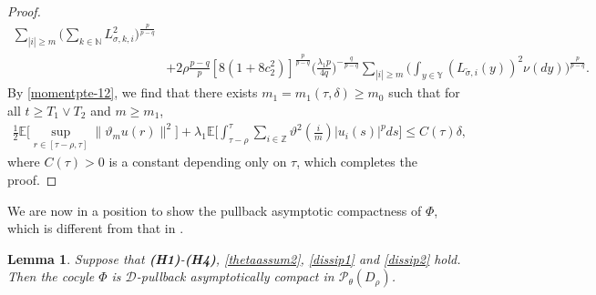 \documentclass[11pt]{article}
\numberwithin{equation}{section}
\theoremstyle{plain}
\newtheorem{lemma}{Lemma}[section]
\begin{document}
\begin{proof}
\begin{align}
                           \sum_{|i| \ge m} 
                                 \Big( \sum_{k \in \mathbb{N} } L^2_{\sigma,k,i} 
                                 \Big)^{ \frac{p}{p-q} } \nonumber\\
        & + 2\rho \frac{p-q}{p} 
                      \left[ 8(1 + 8c_2^2) \right]^{\frac{p}{p-q} }
                         \Big( \frac{\lambda_1 p}{4q} \Big)^{-\frac{q}{p-q} }
                          \sum_{|i| \ge m} 
                                \Big( \int_{y \in \mathbb{Y} }
                                             \left( L_{\tilde{\sigma}, i}(y) \right)^2 
                                                   \nu(dy)
                                \Big)^{ \frac{p}{p-q} }.
 \end{align}
 By \eqref{momentpte-12}, we  
  find that there exists $m_1 = m_1(\tau, \delta) \ge m_0$
 such that for all $t \ge T_1 \vee T_2$ and $m \ge m_1$,
 \begin{align*}
    \frac{1}{2} \mathbb{E}
             \Big[ \sup_{r \in [\tau-\rho,\tau]} \|\vartheta_m u(r)\|^2
             \Big]
     + \lambda_1
          \mathbb{E}
             \Big[ \int_{\tau-\rho}^{\tau}
                       \sum_{i \in \mathbb{Z} }
                             {\vartheta}^2(\frac{i}{m}) |u_i(s)|^p ds
             \Big]
    \le C(\tau) \delta,
 \end{align*}
 where $C(\tau)>0$ is a constant  depending
 only  on $\tau$,
 which completes the proof.
\end{proof}

 We are now 
 in a position to
   show the pullback asymptotic compactness of $\Phi$,  
   which is
    different from  that  in \cite{SSL2024arXiv, LW2024JDE, CWZ2025JNS, SSW2026JDE, BCS2026JDE, mll2024AMO}.

\begin{lemma}\label{pac}
   Suppose that {\bf(H1)}-{\bf(H4)}, \eqref{thetaassum2}, \eqref{dissip1} and \eqref{dissip2}  hold.
   Then 
   the cocyle $\Phi$ is $\mathcal{D}$-pullback asymptotically compact in $\mathcal{P}_{\theta}(D_{\rho})$.
\end{lemma}
\end{document}
